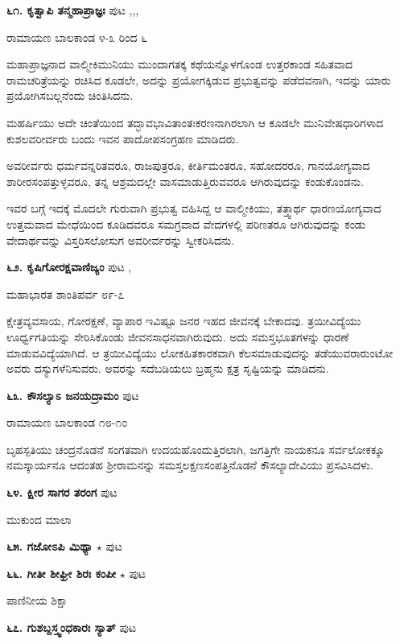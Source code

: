 \medskip
\noindent\textbf{೬೧. ಕೃತ್ವಾಪಿ ತನ್ಮಹಾಪ್ರಾಜ್ಞಃ} \hfill ಪುಟ \pageref{165},\pageref{167},\pageref{209},\pageref{238a}

\hfill ರಾಮಾಯಣ ಬಾಲಕಾಂಡ ೪-೩ ರಿಂದ ೬

ಮಹಾಪ್ರಾಜ್ಞನಾದ ವಾಲ್ಮೀಕಿಮುನಿಯು ಮುಂದಾಗತಕ್ಕ ಕಥೆಯನ್ನೊಳಗೊಂಡ ಉತ್ತರಕಾಂಡ ಸಹಿತವಾದ ರಾಮಚರಿತ್ರೆಯನ್ನು ರಚಿಸಿದ ಕೂಡಲೇ, ಅದನ್ನು ಪ್ರಯೋಗಕ್ಕಿಡುವ ಪ್ರಭುತ್ವವನ್ನು ಪಡೆದವನಾಗಿ, ಇದನ್ನು ಯಾರು ಪ್ರಯೋಗಿಸಬಲ್ಲನೆಂದು ಚಿಂತಿಸಿದನು.

ಮಹರ್ಷಿಯು ಅದೇ ಚಿಂತೆಯಿಂದ ತದ್ಭಾವಭಾವಿತಾಂತಃಕರಣನಾಗಿರಲಾಗಿ ಆ ಕೂಡಲೇ ಮುನಿವೇಷಧಾರಿಗಳಾದ ಕುಶಲವರೀರ್ವರು ಬಂದು ಇವನ ಪಾದೋಪಸಂಗ್ರಹಣ ಮಾಡಿದರು.

ಅವರೀರ್ವರು ಧರ್ಮವನ್ನರಿತವರೂ, ರಾಜಪುತ್ರರೂ, ಕೀರ್ತಿಮಂತರೂ, ಸಹೋದರರೂ, ಗಾನಯೋಗ್ಯವಾದ ಶಾರೀರಸಂಪತ್ತುಳ್ಳವರೂ, ತನ್ನ ಆಶ್ರಮದಲ್ಲೇ ವಾಸಮಾಡುತ್ತಿರುವವರೂ ಆಗಿರುವುದನ್ನು ಕಂಡುಕೊಂಡನು.

ಇವರ ಬಗ್ಗೆ ಇದಕ್ಕೆ ಮೊದಲೇ ಗುರುವಾಗಿ ಪ್ರಭುತ್ವ ವಹಿಸಿದ್ದ ಆ ವಾಲ್ಮೀಕಿಯು, ತತ್ತ್ವಾರ್ಥ ಧಾರಣಯೋಗ್ಯವಾದ ಉತ್ತಮವಾದ ಮೇಧೆಯಿಂದ ಕೂಡಿದವರೂ ಸಮಗ್ರವಾದ ವೇದಗಳಲ್ಲಿ ಪರಿಣತರೂ ಆಗಿರುವುದನ್ನು ಕಂಡು ವೇದಾರ್ಥವನ್ನು ವಿಸ್ತರಿಸಲೋಸುಗ ಅವರೀರ್ವರನ್ನು ಸ್ವೀಕರಿಸಿದನು.

\medskip
\noindent\textbf{೬೨. ಕೃಷಿಗೋರಕ್ಷವಾಣಿಜ್ಯಂ} \hfill ಪುಟ \pageref{75},\pageref{225a}

\hfill ಮಹಾಭಾರತ ಶಾಂತಿಪರ್ವ ೮೯-೭

ಕ್ಷೇತ್ರವ್ಯವಸಾಯ, ಗೋರಕ್ಷಣೆ, ವ್ಯಾಪಾರ ಇವಿಷ್ಟೂ ಜನರ ಇಹದ ಜೀವನಕ್ಕೆ ಬೇಕಾದವು. ತ್ರಯೀವಿದ್ಯೆಯು ಊರ್ಧ್ವಗತಿಯನ್ನು ಸೇರಿಸಿಕೊಂಡು ಜೀವನಸಾಧನವಾಗಿರುವುದು. ಅದು ಸಮಸ್ತಭೂತಗಳನ್ನು ಧಾರಣೆ ಮಾಡುವವಿದ್ಯೆಯಾಗಿದೆ. ಆ ತ್ರಯೀವಿದ್ಯೆಯು ಲೋಕಹಿತಕಾರಕವಾಗಿ ಕೆಲಸಮಾಡುವುದನ್ನು ತಡೆಯುವರಾರುಂಟೋ ಅವರು ದಸ್ಯುಗಳೆನಿಸುವರು. ಅವರನ್ನು ಸದೆಬಡಿಯಲು ಬ್ರಹ್ಮನು ಕ್ಷತ್ರ ಸೃಷ್ಟಿಯನ್ನು ಮಾಡಿದನು.

\medskip
\noindent\textbf{೬೩. ಕೌಸಲ್ಯಾಽ ಜನಯದ್ರಾಮಂ} \hfill ಪುಟ \pageref{252}

\hfill ರಾಮಾಯಣ ಬಾಲಕಾಂಡ ೧೮-೧೦

ಬೃಹಸ್ಪತಿಯು ಚಂದ್ರನೊಡನೆ ಸಂಗತವಾಗಿ ಉದಯಹೊಂದುತ್ತಿರಲಾಗಿ, ಜಗತ್ತಿಗೇ ನಾಯಕನೂ ಸರ್ವಲೋಕಕ್ಕೂ ನಮಸ್ಕಾರ್ಯನೂ ಆದಂತಹ ಶ್ರೀರಾಮನನ್ನು ಸಮಸ್ತಲಕ್ಷಣಸಂಪತ್ತಿನೊಡನೆ ಕೌಸಲ್ಯಾದೇವಿಯು ಪ್ರಸವಿಸಿದಳು.

\medskip
\noindent\textbf{೬೪. ಕ್ಷೀರ ಸಾಗರ ತರಂಗ} \hfill ಪುಟ \pageref{147}

\hfill ಮುಕುಂದ ಮಾಲಾ

\medskip
\noindent\textbf{೬೫. ಗಜೋಽಪಿ ಮಿಥ್ಯಾ} $\star$ \hfill ಪುಟ \pageref{54}

\medskip
\noindent\textbf{೬೬. ಗೀತೀ ಶೀಘ್ರೀ ಶಿರಃ ಕಂಪೀ} $\star$ \hfill ಪುಟ \pageref{5}

\hfill ಪಾಣಿನೀಯ ಶಿಕ್ಷಾ
 
\medskip
\noindent\textbf{೬೭. ಗುಶಬ್ದಸ್ತ್ವಂಧಕಾರಃ ಸ್ಯಾತ್} \hfill ಪುಟ \pageref{98a}


